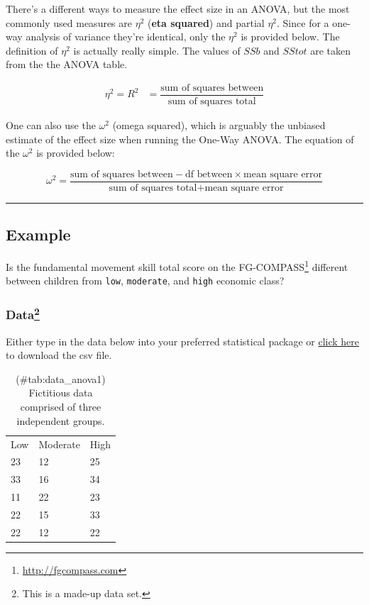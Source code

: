 \documentclass[
]{article}
\begin{document}
There's a different ways to measure the effect size in an ANOVA, but the most commonly used measures are \(\eta^2\) (\textbf{eta squared}) and partial \(\eta^2\). Since for a one-way analysis of variance they're identical, only the \(\eta^2\) is provided below. The definition of \(\eta^2\) is actually really simple. The values of \(SSb\) and \(SStot\) are taken from the the ANOVA table.

\[
\begin{align}
\eta^2 = R^2 
&= \dfrac{\mbox{sum of squares between}}{\mbox{sum of squares total}}
\end{align}
\]

One can also use the \(\omega^2\) (omega squared), which is arguably the unbiased estimate of the effect size when running the One-Way ANOVA. The equation of the \(\omega^2\) is provided below:

\[
\omega^2 = \frac{\mbox{sum of squares between} - \mbox{df between} \times \mbox{mean square error}}{\mbox{sum of squares total} + \mbox{mean square error}}
\]

\begin{center}\rule{0.5\linewidth}{0.5pt}\end{center}

\hypertarget{example}{%
\subsection{Example}\label{example}}

Is the fundamental movement skill total score on the FG-COMPASS\footnote{\url{http://fgcompass.com}} different between children from \texttt{low}, \texttt{moderate}, and \texttt{high} economic class?

\hypertarget{data3}{%
\subsubsection[Data]{\texorpdfstring{Data\footnote{This is a made-up data set.}}{Data}}\label{data3}}

Either type in the data below into your preferred statistical package or \href{data_les_1anova.csv}{click here} to download the csv file.

\begin{longtable}[]{@{}lll@{}}
\caption{(\#tab:data\_anova1) Fictitious data comprised of three independent groups.}\tabularnewline
\toprule()
\endhead
Low & Moderate & High \\
23 & 12 & 25 \\
33 & 16 & 34 \\
11 & 22 & 23 \\
22 & 15 & 33 \\
22 & 12 & 22 \\
\bottomrule()
\end{longtable}
\end{document}
